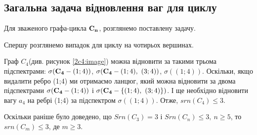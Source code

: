 \subsection{Загальна задача відновлення ваг для циклу}
Для зваженого графа-цикла ${\bf C_n}$, розглянемо поставлену задачу.

Спершу розглянемо випадок для циклу на чотирьох вершинах.

Граф $C_4$(див. рисунок \ref{2c4:image}) можна відновити за такими трьома підспектрами: $\sigma({\bf C_4}-(1;4))$, $\sigma({\bf C_4}-{(1;4),\ (3;4)})$, $\sigma((1;4))$. Оскільки, якщо видалити ребро (1;4) ми отримаємо ланцюг, який можна відновити за двома підспектрами $\sigma({\bf C_4}-(1;4))$ і $\sigma({\bf C_4}-\{(1;4),\ (3;4)\})$. І ще необхідно відновити вагу $a_4$ на ребрі (1;4) за підспектром $\sigma((1;4))$. Отже, $srn(C_4)\leq 3$.

Оскільки раніше було доведено, що $Srn(C_3) = 3$ і  $Srn(C_n) \leq 3,\ n\geq 5$, то $srn(C_m) \leq 3$, де $m\geq3$.